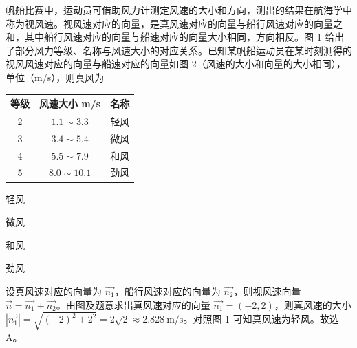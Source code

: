 \documentclass{exam-zh}
\begin{document}
\begin{question}
帆船比赛中，运动员可借助风力计测定风速的大小和方向，测出的结果在航海学中称为视风速。视风速对应的向量，是真风速对应的向量与船行风速对应的向量之和，其中船行风速对应的向量与船速对应的向量大小相同，方向相反。图 1 给出了部分风力等级、名称与风速大小的对应关系。已知某帆船运动员在某时刻测得的视风风速对应的向量与船速对应的向量如图 2（风速的大小和向量的大小相同），单位（m/s），则真风为 \paren[A]

\begin{center}
\begin{tabular}{|c|c|c|}
\hline
等级 & 风速大小 m/s & 名称 \\
\hline
2 & $1.1\sim 3.3$ & 轻风 \\
\hline
3 & $3.4\sim 5.4$ & 微风 \\
\hline
4 & $5.5\sim 7.9$ & 和风 \\
\hline
5 & $8.0\sim 10.1$ & 劲风 \\
\hline
\end{tabular}

\vspace{4pt}{\footnotesize 图 1}
\end{center}

\begin{center}
\end{center}

\begin{choices}
  \item 轻风
  \item 微风
  \item 和风
  \item 劲风
\end{choices}
\begin{solution}
设真风速对应的向量为 $\vec{n_{1}}$，船行风速对应的向量为 $\vec{n_{2}}$，则视风速向量 $\vec{n}=\vec{n_{1}}+\vec{n_{2}}$。由图及题意求出真风速对应的向量 $\vec{n_{1}}=(-2,2)$，则真风速的大小 $|\vec{n_{1}}|=\sqrt{(-2)^{2}+2^{2}}=2\sqrt{2}\approx 2.828\ \text{m/s}$。对照图 1 可知真风速为轻风。故选 A。
\end{solution}
\end{question}
\end{document}
